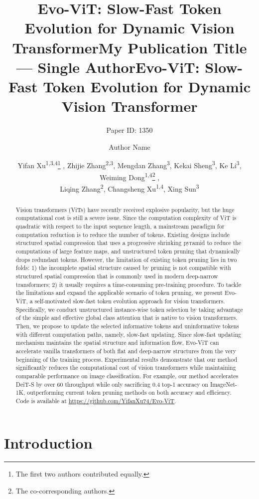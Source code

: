 \documentclass[letterpaper]{article} \usepackage{aaai22}  \usepackage{times}  \usepackage{helvet}  \usepackage{courier}  \usepackage[hyphens]{url}  \usepackage{graphicx} \urlstyle{rm} \def\UrlFont{\rm}  \usepackage{natbib}  \usepackage{caption} \DeclareCaptionStyle{ruled}{labelfont=normalfont,labelsep=colon,strut=off} \frenchspacing  \setlength{\pdfpagewidth}{8.5in}  \setlength{\pdfpageheight}{11in}  \usepackage{algorithm}
\title{Evo-ViT: Slow-Fast Token Evolution for Dynamic Vision Transformer}
\author{Paper ID: 1350}
\title{My Publication Title --- Single Author}
\author {
    Author Name
}
\title{Evo-ViT: Slow-Fast Token Evolution for Dynamic Vision Transformer}
\author{Yifan Xu\textsuperscript{\rm 1,3,4}\thanks{The first two authors contributed equally. 
}
, Zhijie Zhang\textsuperscript{\rm 2,3}, Mengdan Zhang\textsuperscript{\rm 3}, Kekai Sheng\textsuperscript{\rm 3}, Ke Li\textsuperscript{\rm 3}, Weiming Dong\textsuperscript{\rm 1,4}\thanks{The co-corresponding authors.}
, \\Liqing Zhang\textsuperscript{\rm 2}, Changsheng Xu\textsuperscript{\rm 1,4}, Xing Sun\textsuperscript{\rm 3}\\}
\begin{document}
\maketitle


\begin{abstract}




Vision transformers (ViTs) have recently received explosive popularity, but the huge computational cost is still a severe issue. Since the computation complexity of ViT is quadratic with respect to the input sequence length, a mainstream paradigm for computation reduction is to reduce the number of tokens. Existing designs include structured spatial compression that uses a progressive shrinking pyramid to reduce the computations of large feature maps, and unstructured token pruning that dynamically drops redundant tokens. However, the limitation of existing token pruning lies in two folds: 
1) the incomplete spatial structure caused by pruning is not compatible with structured spatial compression that is commonly used in modern deep-narrow transformers;
2) it usually requires a time-consuming pre-training procedure.
To tackle the limitations and expand the applicable scenario of token pruning, we present Evo-ViT, a self-motivated slow-fast token  evolution approach for vision transformers. Specifically, we conduct unstructured instance-wise token selection by taking advantage of the  simple and effective global class attention that is native to vision transformers. Then, we propose to update the selected informative tokens and uninformative tokens with different computation paths, namely, slow-fast updating. Since slow-fast updating mechanism maintains the spatial structure and information flow, Evo-ViT can accelerate vanilla transformers of both flat and deep-narrow structures from the very beginning of the training process. Experimental results demonstrate that our method significantly reduces the computational cost of vision transformers while maintaining comparable performance on image classification. For example, our method accelerates DeiT-S by over 60 throughput while only sacrificing 0.4 top-1 accuracy on ImageNet-1K, outperforming current token pruning methods on both accuracy and efficiency.
Code is available at \textcolor{gray}{\url{https://github.com/YifanXu74/Evo-ViT}}.
\end{abstract}
 
\section{Introduction}
\label{sec:introduction}
\end{document}
